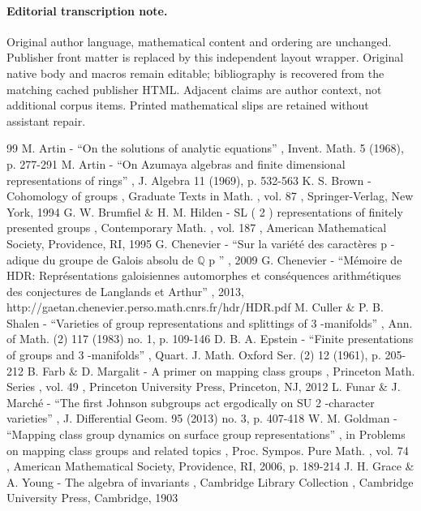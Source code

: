 \documentclass[11pt]{article}
\begin{document}
\paragraph{Editorial transcription note.}
Original author language, mathematical content and ordering are unchanged. Publisher front matter is replaced by this independent layout wrapper. Original native body and macros remain editable; bibliography is recovered from the matching cached publisher HTML. Adjacent claims are author context, not additional corpus items. Printed mathematical slips are retained without assistant repair.
\clearpage

\begin{thebibliography}{99}
 M. Artin - “On the solutions of analytic equations” , Invent. Math. 5 (1968), p. 277-291
 M. Artin - “On Azumaya algebras and finite dimensional representations of rings” , J. Algebra 11 (1969), p. 532-563
 K. S. Brown - Cohomology of groups , Graduate Texts in Math. , vol. 87 , Springer-Verlag, New York, 1994
 G. W. Brumfiel \& H. M. Hilden - SL ( 2 ) representations of finitely presented groups , Contemporary Math. , vol. 187 , American Mathematical Society, Providence, RI, 1995
 G. Chenevier - “Sur la variété des caractères p -adique du groupe de Galois absolu de \(\mathbb Q\) p ” , 2009
 G. Chenevier - “Mémoire de HDR: Représentations galoisiennes automorphes et conséquences arithmétiques des conjectures de Langlands et Arthur” , 2013, http://gaetan.chenevier.perso.math.cnrs.fr/hdr/HDR.pdf
 M. Culler \& P. B. Shalen - “Varieties of group representations and splittings of 3 -manifolds” , Ann. of Math. (2) 117 (1983) no. 1, p. 109-146
 D. B. A. Epstein - “Finite presentations of groups and 3 -manifolds” , Quart. J. Math. Oxford Ser. (2) 12 (1961), p. 205-212
 B. Farb \& D. Margalit - A primer on mapping class groups , Princeton Math. Series , vol. 49 , Princeton University Press, Princeton, NJ, 2012
 L. Funar \& J. Marché - “The first Johnson subgroups act ergodically on SU 2 -character varieties” , J. Differential Geom. 95 (2013) no. 3, p. 407-418
 W. M. Goldman - “Mapping class group dynamics on surface group representations” , in Problems on mapping class groups and related topics , Proc. Sympos. Pure Math. , vol. 74 , American Mathematical Society, Providence, RI, 2006, p. 189-214
 J. H. Grace \& A. Young - The algebra of invariants , Cambridge Library Collection , Cambridge University Press, Cambridge, 1903

\end{thebibliography}
\end{document}
